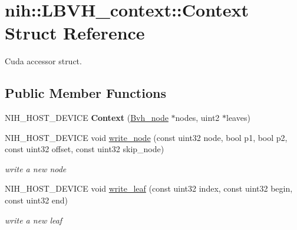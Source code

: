 \hypertarget{structnih_1_1_l_b_v_h__context_1_1_context}{
\section{nih\-:\-:\-L\-B\-V\-H\-\_\-context\-:\-:\-Context \-Struct \-Reference}
\label{structnih_1_1_l_b_v_h__context_1_1_context}
}


\-Cuda accessor struct.  


\subsection*{\-Public \-Member \-Functions}
\begin{DoxyCompactItemize}
\item 
\hypertarget{structnih_1_1_l_b_v_h__context_1_1_context_a7db539520707a6af78a676aec5a4a5bd}{
\-N\-I\-H\-\_\-\-H\-O\-S\-T\-\_\-\-D\-E\-V\-I\-C\-E {\bfseries \-Context} (\hyperlink{structnih_1_1_bvh__node}{\-Bvh\-\_\-node} $\ast$nodes, uint2 $\ast$leaves)}
\label{structnih_1_1_l_b_v_h__context_1_1_context_a7db539520707a6af78a676aec5a4a5bd}

\item 
\hypertarget{structnih_1_1_l_b_v_h__context_1_1_context_ad0dc1af05f28a2c26355d527dfaa9330}{
\-N\-I\-H\-\_\-\-H\-O\-S\-T\-\_\-\-D\-E\-V\-I\-C\-E void \hyperlink{structnih_1_1_l_b_v_h__context_1_1_context_ad0dc1af05f28a2c26355d527dfaa9330}{write\-\_\-node} (const uint32 node, bool p1, bool p2, const uint32 offset, const uint32 skip\-\_\-node)}
\label{structnih_1_1_l_b_v_h__context_1_1_context_ad0dc1af05f28a2c26355d527dfaa9330}

\begin{DoxyCompactList}\small\item\em write a new node \end{DoxyCompactList}\item 
\hypertarget{structnih_1_1_l_b_v_h__context_1_1_context_ac6d102b14fa92503b65859a096a48628}{
\-N\-I\-H\-\_\-\-H\-O\-S\-T\-\_\-\-D\-E\-V\-I\-C\-E void \hyperlink{structnih_1_1_l_b_v_h__context_1_1_context_ac6d102b14fa92503b65859a096a48628}{write\-\_\-leaf} (const uint32 index, const uint32 begin, const uint32 end)}
\label{structnih_1_1_l_b_v_h__context_1_1_context_ac6d102b14fa92503b65859a096a48628}

\begin{DoxyCompactList}\small\item\em write a new leaf \end{DoxyCompactList}\end{DoxyCompactItemize}
